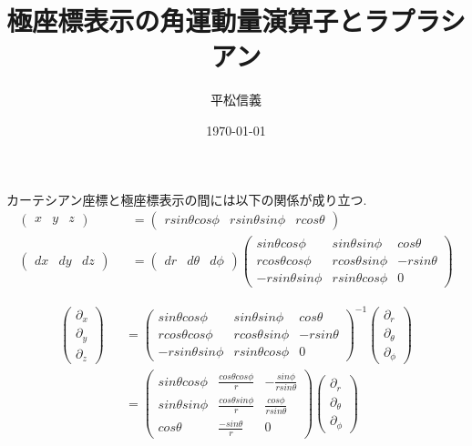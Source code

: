 \documentclass[11pt,a4paper]{jsarticle}
\title{極座標表示の角運動量演算子とラプラシアン}
\author{平松信義}
\date{\today}
\begin{document}
\maketitle

カーテシアン座標と極座標表示の間には以下の関係が成り立つ.
\begin{eqnarray}
\left( \begin{array}{ccc} x & y &z\end{array} \right) &&= \left(\begin{array}{ccc} rsin\theta cos\phi & rsin\theta  sin\phi & rcos\theta  \end{array} \right) \\
\left( \begin{array}{ccc} dx & dy & dz \end{array} \right) &&= \left(\begin{array}{ccc} dr & d\theta & d\phi \end{array} \right)  \left(\begin{array}{ccc} sin\theta cos\phi & sin\theta sin\phi & cos\theta  \\ rcos\theta  cos\phi & r cos\theta  sin\phi & -rsin\theta  \\ -rsin\theta sin\phi & rsin\theta cos\phi & 0 \end{array} \right)
\end{eqnarray}

\begin{eqnarray}
\left( \begin{array}{c} \partial_x \\ \partial_y \\ \partial_z \end{array} \right) &&=
\left(\begin{array}{ccc} sin\theta cos\phi & sin\theta sin\phi & cos\theta  \\ rcos\theta  cos\phi & r cos\theta  sin\phi & -rsin\theta  \\ -rsin\theta sin\phi & rsin\theta cos\phi & 0 \end{array} \right)^{-1} \left( \begin{array}{c} \partial_r \\ \partial_\theta \\ \partial_\phi \end{array} \right) \nonumber \\
&&=\left(\begin{array}{ccc} sin\theta cos\phi & \frac{cos\theta cos\phi}{r} &- \frac{sin\phi}{rsin\theta } \\ sin\theta sin\phi & \frac{cos\theta sin\phi}{r} & \frac{cos\phi}{rsin\theta }\\ cos\theta  & \frac{-sin\theta }{r} & 0 \end{array} \right) \left( \begin{array}{c} \partial_r \\ \partial_\theta \\ \partial_\phi \end{array} \right) 
\end{eqnarray}
\end{document}
